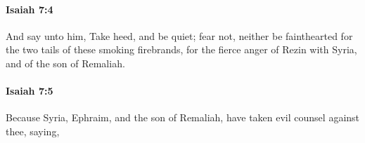 		\paragraph{Isaiah 7:4} %
			\label{ISAIAH-7-4}

			And say unto him, Take heed, and be quiet; fear not, neither be fainthearted for the two tails of these smoking firebrands, for the fierce anger of Rezin with Syria, and of the son of Remaliah.


		\paragraph{Isaiah 7:5} %
			\label{ISAIAH-7-5}

			Because Syria, Ephraim, and the son of Remaliah, have taken evil counsel against thee, saying,


